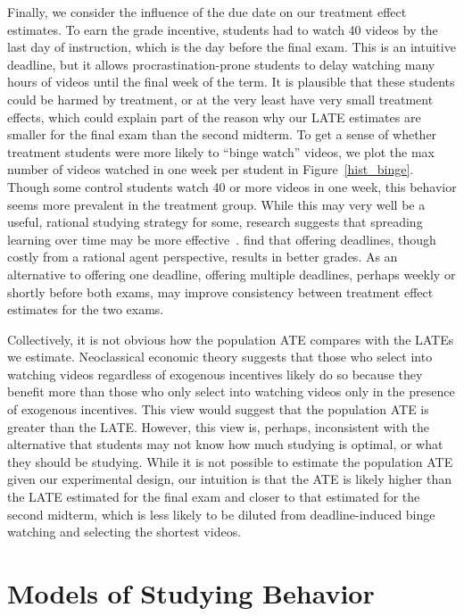 \documentclass[12pt]{article}
\begin{document}
Finally, we consider the influence of the due date on our treatment effect estimates.
To earn the grade incentive, students had to watch 40 videos by the last day of instruction, which is the day before the final exam.
This is an intuitive deadline, but it allows procrastination-prone students to delay watching many hours of videos until the final week of the term.
It is plausible that these students could be harmed by treatment, or at the very least have very small treatment effects, which could explain part of the reason why our LATE estimates are smaller for the final exam than the second midterm.
To get a sense of whether treatment students were more likely to ``binge watch'' videos, we plot the max number of videos watched in one week per student in Figure~\ref{hist_binge}.
Though some control students watch 40 or more videos in one week, this behavior seems more prevalent in the treatment group.
While this may very well be a useful, rational studying strategy for some, research suggests that spreading learning over time may be more effective~\parencite{kornell2009}. \textcite{aw2002} find that offering deadlines, though costly from a rational agent perspective, results in better grades.
As an alternative to offering one deadline, offering multiple deadlines, perhaps weekly or shortly before both exams, may improve consistency between treatment effect estimates for the two exams.

Collectively, it is not obvious how the population ATE compares with the LATEs we estimate.
Neoclassical economic theory suggests that those who select into watching videos regardless of exogenous incentives likely do so because they benefit more than those who only select into watching videos only in the presence of exogenous incentives.
This view would suggest that the population ATE is greater than the LATE. However, this view is, perhaps, inconsistent with the alternative that students may not know how much studying is optimal, or what they should be studying.
While it is not possible to estimate the population ATE given our experimental design, our intuition is that the ATE is likely higher than the LATE estimated for the final exam and closer to that estimated for the second midterm, which is less likely to be diluted from deadline-induced binge watching and selecting the shortest videos.

\section{Models of Studying Behavior} \label{sec:models}
\end{document}
